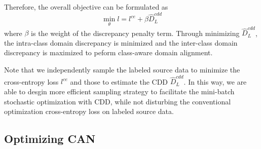 \documentclass[conference]{IEEEtran}
\begin{document}
Therefore, the overall objective can be formulated as
\begin{equation}
    \min_\theta l = l^{ce} + \beta  \hat{D}^{cdd}_L
\end{equation}
where $\beta$ is the weight of the discrepancy penalty term. Through minimizing $\hat{D}^{cdd}_L$, the intra-class domain discrepancy is minimized and the inter-class domain discrepancy is maximized to peform class-aware domain alignment.

Note that we independently sample the labeled source data to minimize the cross-entropy loss $l^{ce}$ and those to estimate the CDD $\hat{D}^{cdd}_L$. In this way, we are able to desgin more efficient sampling strategy to facilitate the mini-batch stochastic optimization with CDD,
while not disturbing the conventional optimization cross-entropy loss on labeled source data.

\subsection{Optimizing CAN}




\end{document}
